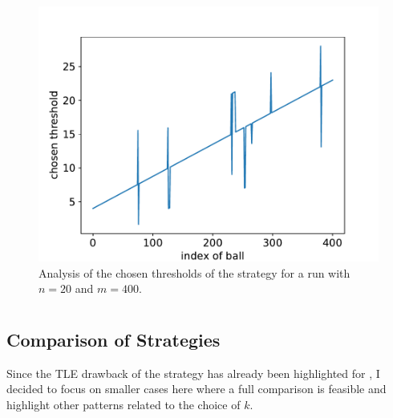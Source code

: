 \begin{figure}[ht]
    \centering
    \includegraphics[scale=0.6]{Chapter4/Figs/dqn_learnt_thresholds_20_400.pdf}
    \caption{Analysis of the chosen thresholds of the \DQN strategy for a run with $n=20$ and $m=400$.}
    \label{two-thinning-dqn-thresholds}
\end{figure}



\section{\KThinning}



\subsection{Comparison of Strategies} \label{k-thinning-comparison}


Since the TLE drawback of the \DP strategy has already been highlighted for \TwoThinning, I decided to focus on smaller cases here where a full comparison is feasible and highlight other patterns related to the choice of $k$.


